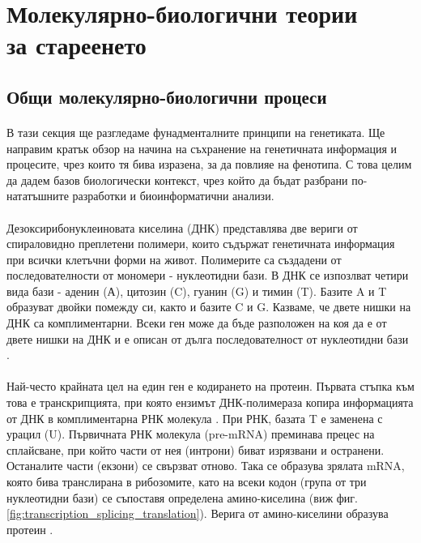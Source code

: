 \documentclass[pdftex,cyrillic,14pt,a4page,twoside,openright]{extreport}
\begin{document}
\section[Молекулярно-биологични теории за стареенето]{Молекулярно-биологични теории\\ за стареенето}
\subsection{Общи молекулярно-биологични процеси}\label{sec:basic_genetics}
\paragraph{}
В тази секция ще разгледаме фунадменталните принципи на генетиката. Ще направим кратък обзор на начина на съхранение на генетичната информация и процесите, чрез които тя бива изразена, за да повлияе на фенотипа. С това целим да дадем базов биологически контекст, чрез който да бъдат разбрани по-нататъшните разработки и биоинформатични анализи.

\paragraph{}
Дезоксирибонуклеиновата киселина (ДНК) представлява две вериги от спираловидно преплетени полимери, които съдържат генетичната информация при всички клетъчни форми на живот. Полимерите са създадени от последователности от мономери - нуклеотидни бази. В ДНК се изпозлват четири вида бази - аденин (А), цитозин (C), гуанин (G) и тимин (T). Базите A и T образуват двойки помежду си, както и базите C и G. Казваме, че двете нишки на ДНК са комплиментарни. Всеки ген може да бъде разположен на коя да е от двете нишки на ДНК и е описан от дълга последователност от нуклеотидни бази \cite[стр. 301-310]{klug2014}.

\paragraph{}
Най-често крайната цел на един ген е кодирането на протеин. Първата стъпка към това е транскрипцията, при която ензимът ДНК-полимераза копира информацията от ДНК в комплиментарна РНК молекула \cite{sims2004}. При РНК, базата T е заменена с урацил (U). Първичната РНК молекула (pre-mRNA) преминава прецес на сплайсване, при който части от нея (интрони) биват изрязвани и остранени. Останалите части (екзони) се свързват отново. Така се образува зрялата mRNA, която бива транслирана в рибозомите, като на всеки кодон (група от три нуклеотидни бази) се съпоставя определена амино-киселина (виж фиг. \ref{fig:transcription_splicing_translation}). Верига от амино-киселини образува протеин \cite[стр. 412-420]{klug2014}.
\end{document}
